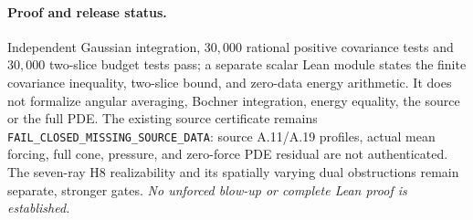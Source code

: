 \paragraph{Proof and release status.}
Independent Gaussian integration, $30{,}000$ rational positive
covariance tests and $30{,}000$ two-slice budget tests pass; a
separate scalar Lean module states the finite covariance inequality,
two-slice bound, and zero-data energy arithmetic. It does not
formalize angular averaging, Bochner integration, energy equality,
the source or the full PDE. The existing source certificate remains
\texttt{FAIL\_CLOSED\_MISSING\_SOURCE\_DATA}: source A.11/A.19
profiles, actual mean forcing, full cone, pressure, and zero-force
PDE residual are not authenticated. The seven-ray H8 realizability
and its spatially varying dual obstructions remain separate,
stronger gates. \emph{No unforced blow-up or complete Lean proof
is established.}
